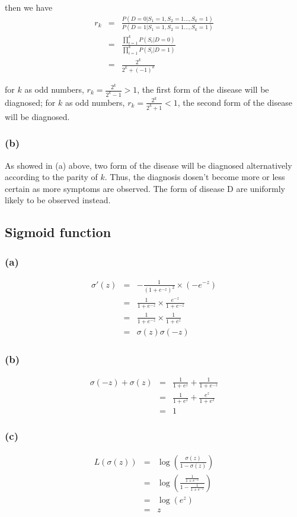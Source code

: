 \documentclass{article}
\begin{document}
then we have
\begin{eqnarray*}
	r_k &=& \frac{P(D=0|S_1=1,S_2=1...,S_k=1)}{P(D=1|S_1=1,S_2=1...,S_k=1)}\\
	&=&\frac{\prod_{i=1}^{k}P(S_i|D=0)}{\prod_{i=1}^{k}P(S_i|D=1)}\\
	&=&\frac{2^k}{2^k+(-1)^k}
\end{eqnarray*}

for $k$ as odd numbers, $r_k = \frac{2^k}{2^k-1} > 1$, the first form of the disease will be diagnosed; for $k$ as odd numbers, $r_k = \frac{2^k}{2^k+1} < 1$, the second form of the disease will be diagnosed.

\subsubsection*{(b)}

As showed in (a) above, two form of the disease will be diagnosed alternatively according to the parity of $k$. Thus, the diagnosis dosen't become more or less certain as more symptoms are observed. The form of disease D are uniformly likely to be observed instead.

\subsection*{Sigmoid function}
\subsubsection*{(a)}
\begin{eqnarray*}
	\sigma'(z) &=& -\frac{1}{(1+e^{-z})^2} \times (-e^{-z}) \\
		&=& \frac{1}{1+e^{-z}} \times \frac{e^{-z}}{1+e^{-z}} \\
		&=& \frac{1}{1+e^{-z}} \times \frac{1}{1+e^{z}} \\
		&=& \sigma(z) \sigma(-z)
\end{eqnarray*}

\subsubsection*{(b)}
\begin{eqnarray*}
	\sigma(-z) + \sigma(z) &=&  \frac{1}{1+e^{z}} + \frac{1}{1+e^{-z}}\\
	&=& \frac{1}{1+e^{z}} + \frac{e^z}{1+e^z}\\
	&=& 1
\end{eqnarray*}

\subsubsection*{(c)}
\begin{eqnarray*}
	L(\sigma(z)) &=& \log(\frac{\sigma(z)}{1-\sigma(z)})\\
	&=& \log(\frac{\frac{1}{1+e^{-z}}}{1-\frac{1}{1+e^{-z}}})\\
	&=& \log(e^z)\\
	&=& z
\end{eqnarray*}
\end{document}
